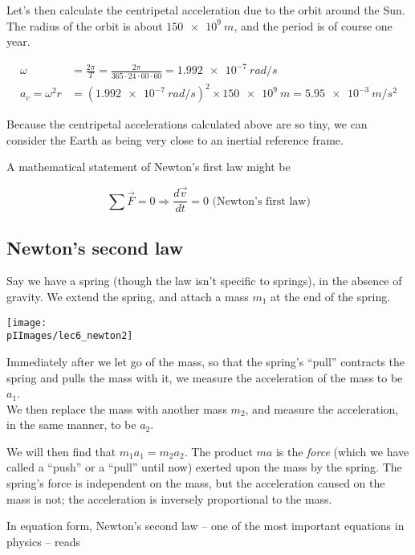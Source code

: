 Let's then calculate the centripetal acceleration due to the orbit around the Sun. The radius of the orbit is about $\SI{150e9}{m}$, and the period is of course one year.

\begin{align}
\omega &= \frac{2 \pi}{T} = \frac{2 \pi}{365 \cdot 24 \cdot 60 \cdot 60} = \SI{1.992e-7}{rad/s}\\
a_c = \omega^2 r &= (\SI{1.992e-7}{rad/s})^2 \times \SI{150e9}{m} = \SI{5.95e-3}{m/s^2}
\end{align}

Because the centripetal accelerations calculated above are so tiny, we can consider the Earth as being very close to an inertial reference frame.

A mathematical statement of Newton's first law might be

\begin{equation}
\sum \vec{F} = 0 \Rightarrow \frac{d\vec{v}}{dt} = 0 \text{ (Newton's first law)} \label{eq:newton1}
\end{equation}

\subsection{Newton's second law}

Say we have a spring (though the law isn't specific to springs), in the absence of gravity. We extend the spring, and attach a mass $m_1$ at the end of the spring.

\begin{center}
\texttt{[image: \\pIImages/lec6\_newton2]}
\end{center}

Immediately after we let go of the mass, so that the spring's ``pull'' contracts the spring and pulls the mass with it, we measure the acceleration of the mass to be $a_1$.\\
We then replace the mass with another mass $m_2$, and measure the acceleration, in the same manner, to be $a_2$.

We will then find that $m_1 a_1 = m_2 a_2$. The product $m a$ is the \emph{force} (which we have called a ``push'' or a ``pull'' until now) exerted upon the mass by the spring. The spring's force is independent on the mass, but the acceleration caused on the mass is not; the acceleration is inversely proportional to the mass.

In equation form, Newton's second law -- one of the most important equations in physics -- reads

